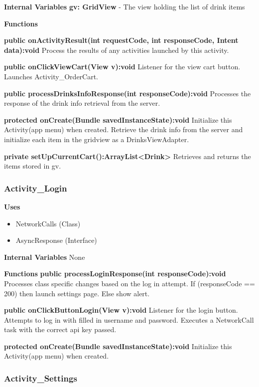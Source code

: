 \documentclass [10pt]{article}
\begin{document}
\textbf{Internal Variables}
\textbf{gv: GridView} - The view holding the list of drink items

\textbf{Functions}

\textbf{public onActivityResult(int requestCode, int responseCode, Intent data):void}
Process the results of any activities launched by this activity.

\textbf{public onClickViewCart(View v):void}
Listener for the view cart button. Launches Activity\_OrderCart.

\textbf{public processDrinksInfoResponse(int responseCode):void}
Processes the response of the drink info retrieval from the server.

\textbf{protected onCreate(Bundle savedInstanceState):void}
Initialize this Activity(app menu) when created. Retrieve the drink info from the server and initialize each item in the gridview as a DrinksViewAdapter. 

\textbf{private setUpCurrentCart():ArrayList<Drink>}
Retrieves and returns the items stored in gv.

\subsubsection{Activity\_Login}

\textbf{Uses}

\begin{itemize}
	\item NetworkCalls (Class)
	\item AsyncResponse (Interface)
\end{itemize}

\textbf{Internal Variables} None

\textbf{Functions}
\textbf{public processLoginResponse(int responseCode):void}
Processes class specific changes based on the log in attempt. If (responseCode == 200) then launch settings page. Else show alert.

\textbf{public onClickButtonLogin(View v):void}
Listener for the login button. Attempts to log in with filled in username and password. Executes a NetworkCall task with the correct api key passed.

\textbf{protected onCreate(Bundle savedInstanceState):void}
Initialize this Activity(app menu) when created.

\subsubsection{Activity\_Settings}
\end{document}
